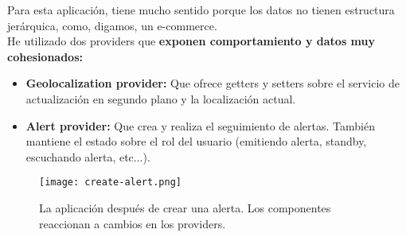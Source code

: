Para esta aplicación, tiene mucho sentido porque los datos no tienen estructura jerárquica, como, digamos, un e-commerce. \\
He utilizado dos providers que \textbf{exponen comportamiento y datos muy cohesionados:}
\begin{itemize}
	\item \textbf{Geolocalization provider:} Que ofrece getters y setters sobre el servicio de actualización en segundo plano y la localización actual.
	\item \textbf{Alert provider:} Que crea y realiza el seguimiento de alertas. También mantiene el estado sobre el rol del usuario (emitiendo alerta, standby, escuchando alerta, etc...).
\end{itemize}

\begin{figure}[H]\label{fig:alert}
	\centering	
	\texttt{[image: create-alert.png]}
	\caption{La aplicación después de crear una alerta. Los componentes reaccionan a cambios en los providers.}
	\end{figure}
